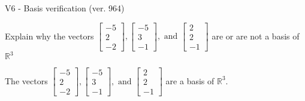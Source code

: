 \begin{exercise}
  \begin{exerciseTitle}V6 - Basis verification (ver. 964)\end{exerciseTitle}
  \begin{exerciseStatement}
    Explain why the vectors \(\left[\begin{array}{r}
-5 \\
2 \\
-2
\end{array}\right] , \left[\begin{array}{r}
-5 \\
3 \\
-1
\end{array}\right] , \text{ and } \left[\begin{array}{r}
2 \\
2 \\
-1
\end{array}\right]\) are or are not a basis of \(\mathbb{R}^3\)	


  \end{exerciseStatement}
  \begin{exerciseAnswer}
   The vectors \(\left[\begin{array}{r}
-5 \\
2 \\
-2
\end{array}\right] , \left[\begin{array}{r}
-5 \\
3 \\
-1
\end{array}\right] , \text{ and } \left[\begin{array}{r}
2 \\
2 \\
-1
\end{array}\right]\) 
  	 are  a basis of \(\mathbb{R}^3\).
  


  \end{exerciseAnswer}
\end{exercise}